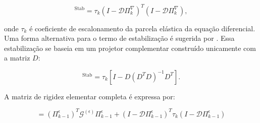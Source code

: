     \begin{equation}
        [K]^{\text{Stab}} = \tau_k (I - \mathcal{D}\Pi_{k}^\nabla)^T (I - \mathcal{D}\Pi_{k}^\nabla),
        \label{eq:4.66}
    \end{equation}

    \noindent onde $\tau_k$ é coeficiente de escalonamento da parcela elástica da equação diferencial.\\ 
    \indent Uma forma alternativa para o termo de estabilização é sugerida por \citet{arbitraryorder2dvirtualelementspolygonalmeshespartelasticproblem2017a}. Essa estabilização se baseia em um projetor complementar construído unicamente com a matriz $D$:

    \begin{equation}
        [K]^{\text{Stab}} = \tau_k \left[ I - D (D^T D)^{-1} D^T \right].
        \label{eq:4.67}
    \end{equation}

    \indent A matriz de rigidez elementar completa é expressa por: 
    
    \begin{equation}
        [K] = (\Pi_{k-1}^\epsilon)^T \mathcal{G}^{(\epsilon)} \Pi_{k-1}^\epsilon + (I - \mathcal{D}\Pi_{k-1}^\epsilon)^T \tau_k (I - \mathcal{D}\Pi_{k-1}^\epsilon) 
        \label{eq:4.68}
    \end{equation}

